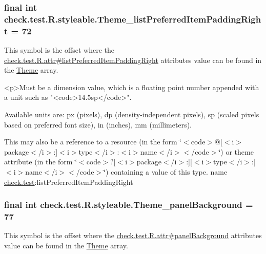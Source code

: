 \subsubsection[{Theme\+\_\+list\+Preferred\+Item\+Padding\+Right}]{\setlength{\rightskip}{0pt plus 5cm}final int check.\+test.\+R.\+styleable.\+Theme\+\_\+list\+Preferred\+Item\+Padding\+Right = 72\hspace{0.3cm}{\ttfamily [static]}}\label{classcheck_1_1test_1_1_r_1_1styleable_a784a9d6670f4b87a95a04b867b4b4e7b}
This symbol is the offset where the \hyperlink{classcheck_1_1test_1_1_r_1_1attr_a6d029d520bbcf01ad4cbef4eb98f7e94}{check.\+test.\+R.\+attr\#list\+Preferred\+Item\+Padding\+Right} attribute\textquotesingle{}s value can be found in the \hyperlink{classcheck_1_1test_1_1_r_1_1styleable_acca726d02016a0cf607782ec3a436a81}{Theme} array.

\begin{DoxyVerb}      <p>Must be a dimension value, which is a floating point number appended with a unit such as "<code>14.5sp</code>".
\end{DoxyVerb}
 Available units are\+: px (pixels), dp (density-\/independent pixels), sp (scaled pixels based on preferred font size), in (inches), mm (millimeters). 

This may also be a reference to a resource (in the form \char`\"{}$<$code$>$@\mbox{[}$<$i$>$package$<$/i$>$\+:\mbox{]}$<$i$>$type$<$/i$>$\+:$<$i$>$name$<$/i$>$$<$/code$>$\char`\"{}) or theme attribute (in the form \char`\"{}$<$code$>$?\mbox{[}$<$i$>$package$<$/i$>$\+:\mbox{]}\mbox{[}$<$i$>$type$<$/i$>$\+:\mbox{]}$<$i$>$name$<$/i$>$$<$/code$>$\char`\"{}) containing a value of this type.  name \hyperlink{namespacecheck_1_1test}{check.\+test}\+:list\+Preferred\+Item\+Padding\+Right \hypertarget{classcheck_1_1test_1_1_r_1_1styleable_a07ce7800e0d7dc1fce4e70ecde15e5a5}{}
\subsubsection[{Theme\+\_\+panel\+Background}]{\setlength{\rightskip}{0pt plus 5cm}final int check.\+test.\+R.\+styleable.\+Theme\+\_\+panel\+Background = 77\hspace{0.3cm}{\ttfamily [static]}}\label{classcheck_1_1test_1_1_r_1_1styleable_a07ce7800e0d7dc1fce4e70ecde15e5a5}
This symbol is the offset where the \hyperlink{classcheck_1_1test_1_1_r_1_1attr_a67199b3cdfd107c7f6b17e7083ccff84}{check.\+test.\+R.\+attr\#panel\+Background} attribute\textquotesingle{}s value can be found in the \hyperlink{classcheck_1_1test_1_1_r_1_1styleable_acca726d02016a0cf607782ec3a436a81}{Theme} array.

